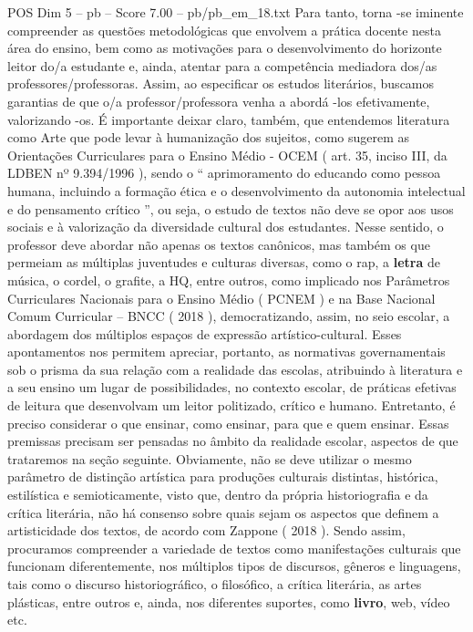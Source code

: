\begin{textsample}{POS Dim 5 – pb – Score 7.00 – pb/pb\_em\_18.txt}
Para tanto, torna -se iminente compreender as questões metodológicas que envolvem a prática docente nesta área do ensino, bem como as motivações para o desenvolvimento do horizonte leitor do/a estudante e, ainda, atentar para a competência mediadora dos/as professores/professoras.
Assim, ao especificar os estudos literários, buscamos garantias de que o/a professor/professora venha a abordá -los efetivamente, valorizando -os.
É importante deixar claro, também, que entendemos literatura como Arte que pode levar à humanização dos sujeitos, como sugerem as Orientações Curriculares para o Ensino Médio - OCEM ( art. 35, inciso III, da LDBEN nº 9.394/1996 ), sendo o “ aprimoramento do educando como pessoa humana, incluindo a formação ética e o desenvolvimento da autonomia intelectual e do pensamento crítico ”, ou seja, o estudo de textos não deve se opor aos usos sociais e à valorização da diversidade cultural dos estudantes.
Nesse sentido, o professor deve abordar não apenas os textos canônicos, mas também os que permeiam as múltiplas juventudes e culturas diversas, como o rap, a \textbf{letra} de música, o cordel, o grafite, a HQ, entre outros, como implicado nos Parâmetros Curriculares Nacionais para o Ensino Médio ( PCNEM ) e na Base Nacional Comum Curricular – BNCC ( 2018 ), democratizando, assim, no seio escolar, a abordagem dos múltiplos espaços de expressão artístico-cultural.
Esses apontamentos nos permitem apreciar, portanto, as normativas governamentais sob o prisma da sua relação com a realidade das escolas, atribuindo à literatura e a seu ensino um lugar de possibilidades, no contexto escolar, de práticas efetivas de leitura que desenvolvam um leitor politizado, crítico e humano.
Entretanto, é preciso considerar o que ensinar, como ensinar, para que e quem ensinar.
Essas premissas precisam ser pensadas no âmbito da realidade escolar, aspectos de que trataremos na seção seguinte.
Obviamente, não se deve utilizar o mesmo parâmetro de distinção artística para produções culturais distintas, histórica, estilística e semioticamente, visto que, dentro da própria historiografia e da crítica literária, não há consenso sobre quais sejam os aspectos que definem a artisticidade dos textos, de acordo com Zappone ( 2018 ).
Sendo assim, procuramos compreender a variedade de textos como manifestações culturais que funcionam diferentemente, nos múltiplos tipos de discursos, gêneros e linguagens, tais como o discurso historiográfico, o filosófico, a crítica literária, as artes plásticas, entre outros e, ainda, nos diferentes suportes, como \textbf{livro}, web, vídeo etc.

\end{textsample}
